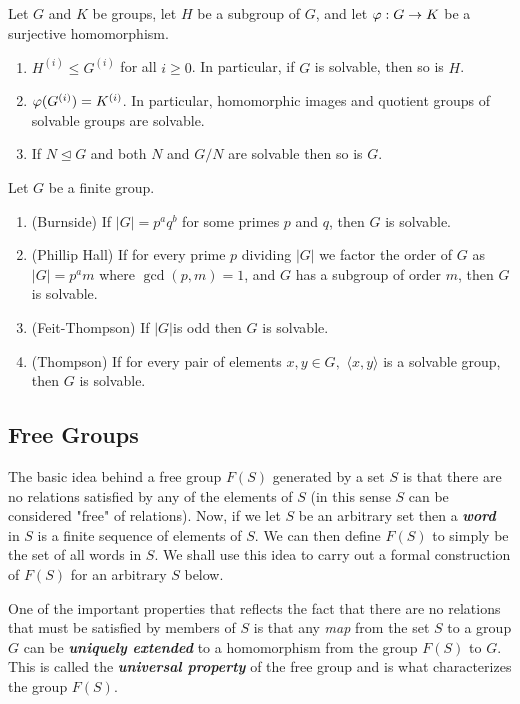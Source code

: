 \nl

\begin{prop}
Let $G$ and $K$ be groups, let $H$ be a subgroup of $G$, and let $\varphi:G\rightarrow K$ be a surjective homomorphism.
\begin{enumerate}
\item $H^{(i)}\leq G^{(i)}$ for all $i\geq 0$. In particular, if $G$ is solvable, then so is $H$. 
\item $\varphi(G^{(i)}) = K^{(i)}$. In particular, homomorphic images and quotient groups of solvable groups are solvable.
\item If $N\unlhd G$ and both $N$ and $G/N$ are solvable then so is $G$.
\end{enumerate}
\end{prop}

\nl

\begin{thm}
Let $G$ be a finite group.
\begin{enumerate}
\item (Burnside) If $|G| = p^aq^b$ for some primes $p$ and $q$, then $G$ is solvable.
\item (Phillip Hall) If for every prime $p$ dividing $|G|$ we factor the order of $G$ as $|G| = p^a m$ where $\gcd(p,m) = 1$, and $G$ has a subgroup of order $m$, then $G$ is solvable.
\item (Feit-Thompson) If $|G|$is odd then $G$ is solvable.
\item (Thompson) If for every pair of elements $x,y\in G,$ $\langle x,y\rangle$ is a solvable group, then $G$ is solvable.
\end{enumerate}
\end{thm}

\newpage

\subsection{Free Groups}\nl

The basic idea behind a free group $F(S)$ generated by a set $S$ is that there are no relations satisfied by any of the elements of $S$ (in this sense $S$ can be considered "free" of relations). Now, if we let $S$ be an arbitrary set then a \textit{\textbf{word}} in $S$ is a finite sequence of elements of $S$. We can then define $F(S)$ to simply be the set of all words in $S$. We shall use this idea to carry out a formal construction of $F(S)$ for an arbitrary $S$ below.

One of the important properties that reflects the fact that there are no relations that must be satisfied by members of $S$ is that any \textit{map} from the set $S$ to a group $G$ can be \textit{\textbf{uniquely extended}} to a homomorphism from the group $F(S)$ to $G$. This is called the \textit{\textbf{universal property}} of the free group and is what characterizes the group $F(S)$.

